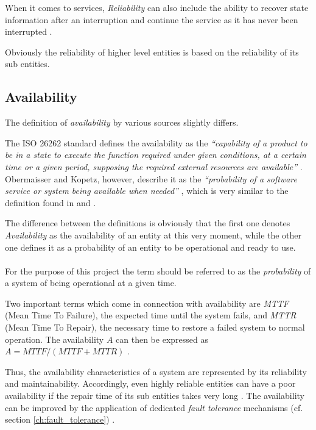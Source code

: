 When it comes to services, \emph{Reliability} can also include the ability to recover state information after an interruption and continue the service as it has never been interrupted \cite{genesys}.

Obviously the reliability of higher level entities is based on the reliability of its sub entities.


\subsection{Availability}

\label{sec:availability}
The definition of \emph{availability} by various sources slightly differs.

The ISO 26262 standard defines the availability as the \emph{``capability of a product to be in a state to execute the function required under given conditions, at a certain time or a given period, supposing the required external resources are available''} \cite{iso26262:1}. Obermaisser and Kopetz, however, describe it as the \emph{``probability of a software service or system being available when needed''} \cite[p.116]{genesys}, which is very similar to the definition found in \cite{lessner} and \cite{nelson}.

The difference between the definitions is obviously that the first one denotes \emph{Availability} as the availability of an entity at this very moment, while the other one defines it as a probability of an entity to be operational and ready to use.
\\
\\
For the purpose of this project the term should be referred to as the \emph{probability} of a system of being operational at a given time.

Two important terms which come in connection with availability are \emph{MTTF} (Mean Time To Failure), the expected time until the system fails, and \emph{MTTR} (Mean Time To Repair), the necessary time to restore a failed system to normal operation. The availability $A$ can then be expressed as $A = MTTF/(MTTF + MTTR)$ \cite{nelson}. 

Thus, the availability characteristics of a system are represented by its reliability and maintainability. Accordingly, even highly reliable entities can have a poor availability if the repair time of its sub entities takes very long \cite{lessner}. The availability can be improved by the application of dedicated \emph{fault tolerance} mechanisms (cf. section \ref{ch:fault_tolerance}) \cite{nelson}.















